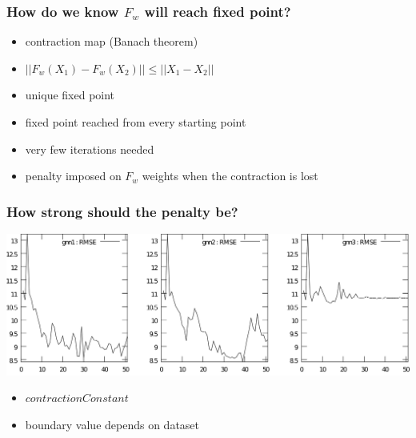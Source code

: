 \documentclass{beamer}
\begin{document}
\begin{frame}
\frametitle{How do we know $F_w$ will reach fixed point?}
\begin{itemize}
	\item contraction map (Banach theorem)
	\item $||F_w(X_1) - F_w(X_2)|| \leq ||X_1 - X_2||$
	\item unique fixed point
	\item fixed point reached from every starting point
	\item very few iterations needed
	\item penalty imposed on $F_w$ weights when the contraction is lost
\end{itemize}
\end{frame}

\begin{frame}
\frametitle{How strong should the penalty be?}
\begin{center}
	\includegraphics[scale=0.065]{img/rmse1_clipped}
\end{center}
\begin{itemize}
	\item $contractionConstant$
	\item boundary value depends on dataset
\end{itemize}
\end{frame}
\end{document}
